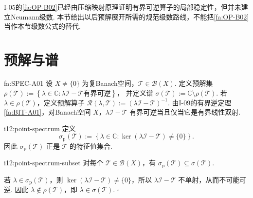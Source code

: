 \begin{FARemark}[与I-05局部可逆稳定性的关系]
I-05的\autoref{fa:OP-B02}已经由压缩映射原理证明有界可逆算子的局部稳定性，但并未建立Neumann级数. 本节给出以后预解展开所需的规范级数路线，不能把\autoref{fa:OP-B02}当作本节级数公式的替代.
\end{FARemark}

\section{预解与谱}\label{sec:i12-spectrum}

\begin{FADefinition}{fa:SPEC-A01}
设 \(\displaystyle X\neq\{0\}\) 为复Banach空间，\(\displaystyle \mathcal T\in\mathcal B(X)\). 定义预解集
\(\displaystyle \rho(\mathcal T) := \left\{ \lambda\in\mathbb C: \lambda\mathcal I-\mathcal T\text{有界可逆} \right\}\)，
并定义谱
\(\displaystyle \sigma(\mathcal T) := \mathbb C\setminus\rho(\mathcal T)\).
若 \(\displaystyle \lambda\in\rho(\mathcal T)\)，定义预解算子
\(\displaystyle \mathcal R(\lambda,\mathcal T) := (\lambda\mathcal I-\mathcal T)^{-1}\).
由I-09的有界逆定理\autoref{fa:BIT-A01}，对Banach空间 \(\displaystyle X\)，\(\displaystyle \lambda\mathcal I-\mathcal T\) 有界可逆当且仅当它是有界线性双射.
\end{FADefinition}

\begin{FADefinition}[B][点谱]{i12:point-spectrum}
定义
\[
\sigma_{\mathrm p}(\mathcal T)
:=
\left\{
\lambda\in\mathbb C:
\ker(\lambda\mathcal I-\mathcal T)\neq\{0\}
\right\}.
\]
因此 \(\displaystyle \sigma_{\mathrm p}(\mathcal T)\) 正是 \(\displaystyle \mathcal T\) 的特征值集合.
\end{FADefinition}

\begin{FAProposition}[C][点谱包含于谱]{i12:point-spectrum-subset}
对每个 \(\displaystyle \mathcal T\in\mathcal B(X)\)，有
\(\displaystyle \sigma_{\mathrm p}(\mathcal T) \subseteq \sigma(\mathcal T)\).
\end{FAProposition}

\begin{FAProof}
若 \(\displaystyle \lambda\in\sigma_{\mathrm p}(\mathcal T)\)，则 \(\displaystyle \ker(\lambda\mathcal I-\mathcal T)\neq\{0\}\)，所以 \(\displaystyle \lambda\mathcal I-\mathcal T\) 不单射，从而不可能可逆. 因此 \(\displaystyle \lambda\notin\rho(\mathcal T)\)，即 \(\displaystyle \lambda\in\sigma(\mathcal T)\).
\hfill\(\square\)
\end{FAProof}

